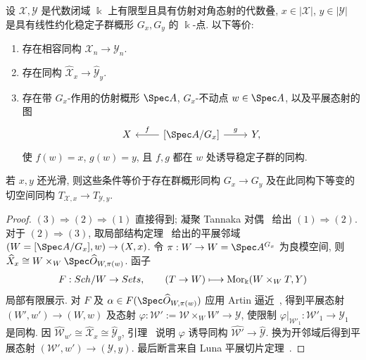 \begin{theorem}\label{src:7.7.23}
设 $\mathcal X,\mathcal Y$ 是代数闭域 $\Bbbk$ 上有限型且具有仿射对角态射的代数叠, $x\in|\mathcal X|$, $y\in|\mathcal Y|$ 是具有线性约化稳定子群概形 $G_x,G_y$ 的 $\Bbbk$-点. 以下等价:
\begin{enumerate}[(1)]
\item 存在相容同构 $\mathcal X_n\to\mathcal Y_n$.
\item 存在同构 $\widehat{\mathcal X}_x\to\widehat{\mathcal Y}_y$.
\item 存在带 $G_x$-作用的仿射概形 $\Spec A$, $G_x$-不动点 $w\in\Spec A$, 以及平展态射的图
\begin{align*}
\begin{tikzcd}[ampersand replacement=\&]
\mathcal X\&{[\Spec A/G_x]}\arrow[l,"{f}"']\arrow[r,"{g}"]\&\mathcal Y,
\end{tikzcd}
\end{align*}
使 $f(w)=x$, $g(w)=y$, 且 $f,g$ 都在 $w$ 处诱导稳定子群的同构.
\end{enumerate}
若 $x,y$ 还光滑, 则这些条件等价于存在群概形同构 $G_x\to G_y$ 及在此同构下等变的切空间同构 $T_{\mathcal X,x}\to T_{\mathcal Y,y}$.
\end{theorem}
\begin{proof}
$(3)\Rightarrow(2)\Rightarrow(1)$ 直接得到; 凝聚 Tannaka 对偶~ 给出 $(1)\Rightarrow(2)$. 对于 $(2)\Rightarrow(3)$, 取局部结构定理~ 给出的平展邻域 $(\mathcal W=[\Spec A/G_x],w)\to(\mathcal X,x)$. 令 $\pi:\mathcal W\to W=\Spec A^{G_x}$ 为良模空间, 则 $\widehat{\mathcal X}_x\cong\mathcal W\times_W\Spec\widehat{\mathcal O}_{W,\pi(w)}$. 函子
\begin{align*}
F:Sch/W\to Sets,\qquad(T\to W)\longmapsto\operatorname{Mor}_{\Bbbk}(W\times_WT,Y)
\end{align*}
局部有限展示. 对 $F$ 及 $\alpha\in F(\Spec\widehat{\mathcal O}_{W,\pi(w)})$ 应用 Artin 逼近~, 得到平展态射 $(W',w')\to(W,w)$ 及态射 $\varphi:\mathcal W':=\mathcal W\times_WW'\to\mathcal Y$, 使限制 $\varphi|_{\mathcal W'_1}:\mathcal W'_1\to\mathcal Y_1$ 是同构. 因 $\widehat{\mathcal W}_{w'}\cong\widehat{\mathcal X}_x\cong\widehat{\mathcal Y}_y$, 引理~ 说明 $\varphi$ 诱导同构 $\widehat{\mathcal W'}\to\widehat{\mathcal Y}$. 换为开邻域后得到平展态射 $(\mathcal W',w')\to(\mathcal Y,y)$. 最后断言来自 Luna 平展切片定理~.
\end{proof}


